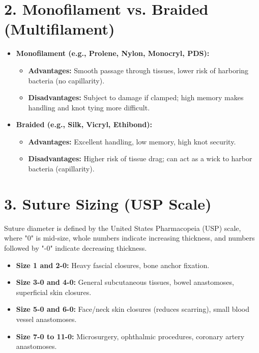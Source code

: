 \section*{2. Monofilament vs. Braided (Multifilament)}
\begin{itemize}
  \item \textbf{Monofilament (e.g., Prolene, Nylon, Monocryl, PDS):}
  \begin{itemize}
    \item \textbf{Advantages:} Smooth passage through tissues, lower risk of harboring bacteria (no capillarity).
    \item \textbf{Disadvantages:} Subject to damage if clamped; high memory makes handling and knot tying more difficult.
  \end{itemize}
  \item \textbf{Braided (e.g., Silk, Vicryl, Ethibond):}
  \begin{itemize}
    \item \textbf{Advantages:} Excellent handling, low memory, high knot security.
    \item \textbf{Disadvantages:} Higher risk of tissue drag; can act as a wick to harbor bacteria (capillarity).
  \end{itemize}
\end{itemize}

\section*{3. Suture Sizing (USP Scale)}
Suture diameter is defined by the United States Pharmacopeia (USP) scale, where "0" is mid-size, whole numbers indicate increasing thickness, and numbers followed by "-0" indicate decreasing thickness.
\begin{itemize}
  \item \textbf{Size 1 and 2-0:} Heavy fascial closures, bone anchor fixation.
  \item \textbf{Size 3-0 and 4-0:} General subcutaneous tissues, bowel anastomoses, superficial skin closures.
  \item \textbf{Size 5-0 and 6-0:} Face/neck skin closures (reduces scarring), small blood vessel anastomoses.
  \item \textbf{Size 7-0 to 11-0:} Microsurgery, ophthalmic procedures, coronary artery anastomoses.
\end{itemize}

\clearpage

